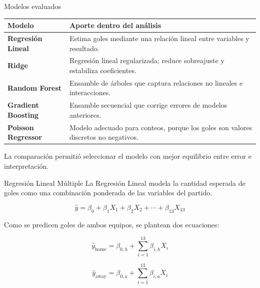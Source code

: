 \documentclass[aspectratio=169]{beamer}
\begin{document}
\begin{frame}{Modelos evaluados}
\small
\begin{tabularx}{\textwidth}{>{\bfseries}p{}X}
\toprule
Modelo & Aporte dentro del análisis \\
\midrule
Regresión Lineal & Estima goles mediante una relación lineal entre variables y resultado.\\
Ridge & Regresión lineal regularizada; reduce sobreajuste y estabiliza coeficientes.\\
Random Forest & Ensamble de árboles que captura relaciones no lineales e interacciones.\\
Gradient Boosting & Ensamble secuencial que corrige errores de modelos anteriores.\\
Poisson Regressor & Modelo adecuado para conteos, porque los goles son valores discretos no negativos.\\
\bottomrule
\end{tabularx}

\vspace{0.25cm}
La comparación permitió seleccionar el modelo con mejor equilibrio entre error e interpretación.
\end{frame}

\begin{frame}{Regresión Lineal Múltiple}
\justifying
La Regresión Lineal modela la cantidad esperada de goles como una combinación ponderada de las variables del partido.

\[
\hat{y} = \beta_0 + \beta_1X_1 + \beta_2X_2 + \cdots + \beta_{13}X_{13}
\]

\vspace{0.2cm}
Como se predicen goles de ambos equipos, se plantean dos ecuaciones:

\[
\hat{y}_{\text{home}} = \beta_{0,h} + \sum_{i=1}^{13}\beta_{i,h}X_i
\]

\[
\hat{y}_{\text{away}} = \beta_{0,a} + \sum_{i=1}^{13}\beta_{i,a}X_i
\]
\end{frame}
\end{document}
